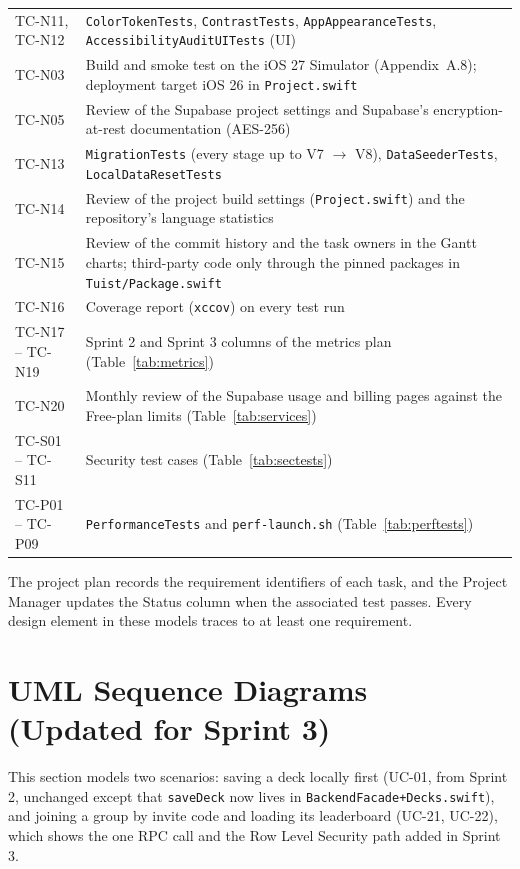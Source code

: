\documentclass[12pt,letterpaper]{article}
\begin{document}
\begin{xltabular}{\textwidth}{@{}L{2.4cm} Y@{}}
TC-N11, TC-N12 & \texttt{ColorTokenTests}, \texttt{ContrastTests}, \texttt{AppAppearanceTests}, \texttt{AccessibilityAuditUITests} (UI) \\
TC-N03 & Build and smoke test on the iOS 27 Simulator (Appendix~A.8); deployment target iOS 26 in \texttt{Project.swift} \\
TC-N05 & Review of the Supabase project settings and Supabase's encryption-at-rest documentation (AES-256) \\
TC-N13 & \texttt{MigrationTests} (every stage up to V7 $\to$ V8), \texttt{DataSeederTests}, \texttt{LocalDataResetTests} \\
TC-N14 & Review of the project build settings (\texttt{Project.swift}) and the repository's language statistics \\
TC-N15 & Review of the commit history and the task owners in the Gantt charts; third-party code only through the pinned packages in \texttt{Tuist/Package.swift} \\
TC-N16 & Coverage report (\texttt{xccov}) on every test run \\
TC-N17 -- TC-N19 & Sprint 2 and Sprint 3 columns of the metrics plan (Table~\ref{tab:metrics}) \\
TC-N20 & Monthly review of the Supabase usage and billing pages against the Free-plan limits (Table~\ref{tab:services}) \\
TC-S01 -- TC-S11 & Security test cases (Table~\ref{tab:sectests}) \\
TC-P01 -- TC-P09 & \texttt{PerformanceTests} and \texttt{perf-launch.sh} (Table~\ref{tab:perftests}) \\
\end{xltabular}

The project plan records the requirement identifiers of each task, and the Project
Manager updates the Status column when the associated test passes. Every design element
in these models traces to at least one requirement.

\section{UML Sequence Diagrams (Updated for Sprint 3)}
This section models two scenarios: saving a deck locally first (UC-01, from Sprint 2,
unchanged except that \texttt{saveDeck} now lives in \texttt{BackendFacade+Decks.swift}),
and joining a group by invite code and loading its leaderboard (UC-21, UC-22), which
shows the one RPC call and the Row Level Security path added in Sprint 3.
\end{document}
